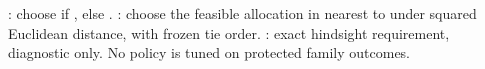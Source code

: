 \markdownRendererUlItem {}: choose  if , else .\markdownRendererUlItemEnd 
\markdownRendererUlItem {}: choose the feasible allocation in  nearest to  under squared Euclidean distance, with frozen tie order.\markdownRendererUlItemEnd 
\markdownRendererUlItem {}: exact hindsight requirement, diagnostic only.\markdownRendererUlItemEnd 
\markdownRendererUlEndTight \markdownRendererInterblockSeparator
{}No policy is tuned on protected family outcomes.
\markdownRendererSectionEnd 
\markdownRendererSectionEnd \markdownRendererDocumentEnd